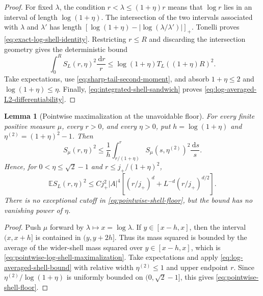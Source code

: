\documentclass[11pt]{article}
\newtheorem{lemma}[theorem]{Lemma}
\theoremstyle{definition}
\theoremstyle{remark}
\newcommand{\E}{\mathbb E}
\newcommand{\abs}[1]{\left\lvert #1\right\rvert}
\newcommand{\dd}{\,\mathrm d}
\begin{document}
\begin{proof}
For fixed $\lambda$, the condition
$r<\lambda\le(1+\eta)r$ means that
$\log r$ lies in an interval of length $\log(1+\eta)$.  The intersection of
the two intervals associated with $\lambda$ and $\lambda'$ has length
$[\log(1+\eta)-|\log(\lambda/\lambda')|]_+$.  Tonelli proves
\eqref{eq:exact-log-shell-identity}.  Restricting $r\le R$ and discarding the
intersection geometry gives the deterministic bound
\begin{equation}
 \int_0^R S_L(r,\eta)^2\frac{\dd r}{r}
 \le\log(1+\eta)T_L((1+\eta)R)^2.
 \label{eq:localized-log-shell-deterministic}
\end{equation}
Take expectations, use \eqref{eq:sharp-tail-second-moment}, and absorb
$1+\eta\le2$ and $\log(1+\eta)\le\eta$.  Finally,
\eqref{eq:integrated-shell-sandwich} proves
\eqref{eq:log-averaged-L2-differentiability}.
\end{proof}


\begin{lemma}[Pointwise maximalization at the unavoidable floor]
\label{lem:log-shell-maximalization}
For every finite positive measure $\mu$, every $r>0$, and every $\eta>0$, put
$h=\log(1+\eta)$ and $\eta^{(2)}=(1+\eta)^2-1$.  Then
\begin{equation}
 \boxed{
 S_\mu(r,\eta)^2
 \le\frac1h\int_{r/(1+\eta)}^r
 S_\mu(s,\eta^{(2)})^2\frac{\dd s}{s}.}
 \label{eq:pointwise-log-shell-maximalization}
\end{equation}
Hence, for $0<\eta\le\sqrt2-1$ and
$r\le j_+/(1+\eta)^2$,
\begin{equation}
 \boxed{
 \E S_L(r,\eta)^2
 \le Cj_+^2\abs A^4\left[
 (r/j_+)^d+L^{-d}(r/j_+)^{d/2}\right].}
 \label{eq:pointwise-shell-floor}
\end{equation}
There is no exceptional cutoff in \eqref{eq:pointwise-shell-floor}, but the
bound has no vanishing power of $\eta$.
\end{lemma}

\begin{proof}
Push $\mu$ forward by $\lambda\mapsto x=\log\lambda$.  If
$y\in[x-h,x]$, then the interval $(x,x+h]$ is contained in
$(y,y+2h]$.  Thus its mass squared is bounded by the average of the wider-shell
mass squared over $y\in[x-h,x]$, which is
\eqref{eq:pointwise-log-shell-maximalization}.  Take expectations and apply
\eqref{eq:log-averaged-shell-bound} with relative width
$\eta^{(2)}\le1$ and upper endpoint $r$.  Since
$\eta^{(2)}/\log(1+\eta)$ is uniformly bounded on
$(0,\sqrt2-1]$, this gives \eqref{eq:pointwise-shell-floor}.
\end{proof}
\end{document}
